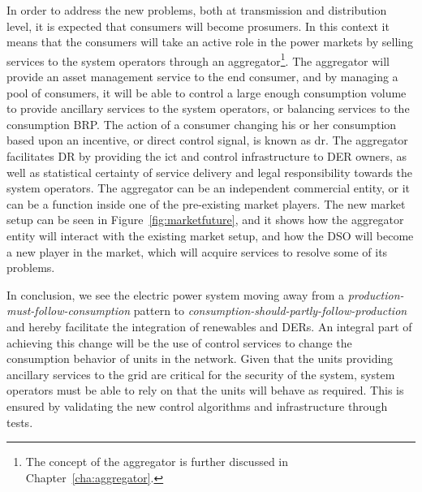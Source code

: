 In order to address the new problems, both at transmission and distribution level, it is expected that consumers will become prosumers. In this context it means that the consumers will take an active role in the power markets by selling services to the system operators through an aggregator\footnote{The concept of the aggregator is further discussed in Chapter~\ref{cha:aggregator}.}. The aggregator will provide an asset management service to the end consumer, and by managing a pool of consumers, it will be able to control a large enough consumption volume to provide ancillary services to the system operators, or balancing services to the consumption BRP. The action of a consumer changing his or her consumption based upon an incentive, or direct control signal, is known as \gls{dr}. The aggregator facilitates DR by providing the \gls{ict} and control infrastructure to DER owners, as well as statistical certainty of service delivery and legal responsibility towards the system operators. The aggregator can be an independent commercial entity, or it can be a function inside one of the pre-existing market players. The new market setup can be seen in Figure~\ref{fig:marketfuture}, and it shows how the aggregator entity will interact with the existing market setup, and how the DSO will become a new player in the market, which will acquire services to resolve some of its problems.

In conclusion, we see the electric power system moving away from a \emph{production-must-follow-consumption} pattern to \emph{consumption-should-partly-follow-production} and hereby facilitate the integration of renewables and DERs. An integral part of achieving this change will be the use of control services to change the consumption behavior of units in the network. Given that the units providing ancillary services to the grid are critical for the security of the system, system operators must be able to rely on that the units will behave as required. This is ensured by validating the new control algorithms and infrastructure through tests.


